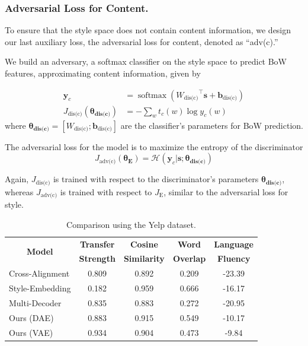 \documentclass[letterpaper]{article} %
\newcommand{\tabh}[1]{\multicolumn{1}{c|}{\textbf{#1}}}
\newcommand{\tabc}[2]{\multicolumn{1}{|c||}{\multirow{#1}{*}{\textbf{#2}}}}
\newcommand{\loss}[1]{J_{\text{#1}}}
\newcommand{\nnweight}[1]{\bm{\theta_{\text{#1}}}}
\begin{document}
\subsubsection{Adversarial Loss for Content.} \label{ssec:adversarial-content-objective}

To ensure that the style space does not contain content information, we design our last auxiliary loss, the adversarial loss for content, denoted as ``adv(c).''

We build an adversary, a softmax classifier on the style space to predict BoW features, approximating content information, given by

\begin{align}
	\bm y_c                          & = \operatorname{softmax}({W_\text{dis(c)}}^\top \bm s + \bm b_\text{dis(c)}) \\
	\label{eqn:adv-bow-disc-loss}
	\loss{dis(c)}(\nnweight{dis(c)}) & =
	- \sum_w t_c(w)\log y_c(w)
\end{align}
where $\nnweight{dis(c)}=[W_\text{dis(c)}; \bm b_\text{dis(c)}]$ are the classifier's parameters for BoW prediction.

The adversarial loss for the model is to maximize the entropy of the discriminator
\begin{equation}
	\loss{adv(c)}(\nnweight{E}) = \mathcal{H}(\bm y_c | \bm s; \nnweight{dis(c)})
\end{equation}

Again, $\loss{dis(c)}$ is trained with respect to the discriminator's parameters $\nnweight{dis(c)}$, whereas $\loss{adv(c)}$ is trained with respect to $\loss{E}$, similar to the adversarial loss for style.

\begin{table}[ht]
	\centering
	\begin{tabular}{| l || c | c | c | c |}
		\hline
		\tabc{2}{Model}                            & \tabh{Transfer} & \tabh{Cosine}     & \tabh{Word}    & \tabh{Language} \\
		                                           & \tabh{Strength} & \tabh{Similarity} & \tabh{Overlap} & \tabh{Fluency}  \\
		\hline
		\hline
		Cross-Alignment \cite{shen2017style}       & 0.809           & 0.892             & 0.209          & -23.39          \\
		\hline
		Style-Embedding \cite{fu2018style}         & 0.182           & 0.959             & 0.666          & -16.17          \\
		\hline
		Multi-Decoder \cite{zhao2018adversarially} & 0.835           & 0.883             & 0.272          & -20.95          \\
		\hline
		Ours (DAE)                                 & 0.883           & 0.915             & 0.549          & -10.17          \\
		\hline
		Ours (VAE)                                 & 0.934           & 0.904             & 0.473          & -9.84           \\
		\hline
	\end{tabular}
	\caption{Comparison using the Yelp dataset.}
	\label{tab:yelp-comparison-previous}
\end{table}
\end{document}
